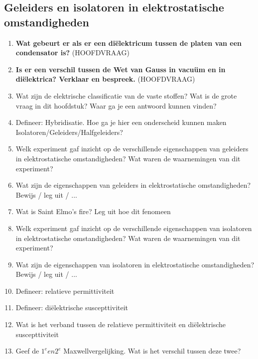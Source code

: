 \documentclass[a4paper,12pt]{article}
\begin{document}
    \subsection{Geleiders en isolatoren in elektrostatische omstandigheden}
    \begin{enumerate}
        \item \textbf{Wat gebeurt er als er een diëlektricum tussen de platen van een condensator is?} (HOOFDVRAAG)
        \item \textbf{Is er een verschil tussen de Wet van Gauss in vacuüm en in diëlektrica? Verklaar en bespreek.} (HOOFDVRAAG)
        \item Wat zijn de elektrische classificatie van de vaste stoffen? Wat is de grote vraag in dit hoofdstuk? Waar ga je een antwoord kunnen vinden?
        \item Defineer: Hybridisatie. Hoe ga je hier een onderscheid kunnen maken Isolatoren/Geleiders/Halfgeleiders?
        \item Welk experiment gaf inzicht op de verschillende eigenschappen van geleiders in elektrostatische omstandigheden? Wat waren de waarnemingen van dit experiment?
        \item Wat zijn de eigenschappen van geleiders in elektrostatische omstandigheden? Bewijs / leg uit / ...
        \item Wat is Saint Elmo's fire? Leg uit hoe dit fenomeen 
        \item Welk experiment gaf inzicht op de verschillende eigenschappen van isolatoren in elektrostatische omstandigheden? Wat waren de waarnemingen van dit experiment?
        \item Wat zijn de eigenschappen van isolatoren in elektrostatische omstandigheden? Bewijs / leg uit / ...
        \item Defineer: relatieve permittiviteit
        \item Defineer: diëlektrische suscepttiviteit
        \item Wat is het verband tussen de relatieve permittiviteit en diëlektrische suscepttiviteit
        \item Geef de $1^e en 2^e$ Maxwellvergelijking. Wat is het verschil tussen deze twee?
    \end{enumerate}
\end{document}
